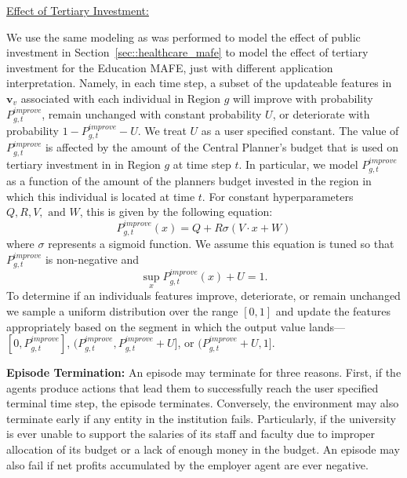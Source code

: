 \underline{Effect of Tertiary Investment:}

We use the same modeling as was performed to model the effect of public investment in Section~\ref{sec::healthcare_mafe} to model the effect of tertiary investment for the Education MAFE, just with different application interpretation. Namely, in each time step, a subset of the updateable features in $\mathbf{v}_v$ associated with each individual in Region $g$ will improve with probability $P_{g,t}^{improve}$, remain unchanged with constant probability $U$, or deteriorate with probability $1-P_{g,t}^{improve}-U$. We treat $U$ as a user specified constant. The value of $P_{g,t}^{improve}$ is affected by the amount of the Central Planner's budget that is used on tertiary investment in in Region $g$ at time step $t$. In particular, we model $P_{g,t}^{improve}$ as a function of the amount of the planners budget invested in the region in which this individual is located at time $t$. For constant hyperparameters $Q,R,V, \text{ and } W$, this is given by the following equation:
\begin{equation}
    \label{eq:improve_function}
    P_{g,t}^{improve}(x) = Q + R\sigma(V\cdot x + W)
\end{equation}
where $\sigma$ represents a sigmoid function. We assume this equation is tuned so that $P_{g,t}^{improve}$ is non-negative and 
\begin{equation}
    \sup_{x} P_{g,t}^{improve}(x) + U= 1.
\end{equation}
To determine if an individuals features improve, deteriorate, or remain unchanged we sample a uniform distribution over the range $[0,1]$ and update the features appropriately based on the segment in which the output value lands---$[0,P_{g,t}^{improve}]$, $(P_{g,t}^{improve},P_{g,t}^{improve}+U]$, or $(P_{g,t}^{improve}+U,1]$.


\textbf{Episode Termination:} An episode may terminate for three reasons. First, if the agents produce actions that lead them to successfully reach the user specified terminal time step, the episode terminates. Conversely, the environment may also terminate early if any entity in the institution fails. Particularly, if the university is ever unable to support the salaries of its staff and faculty due to improper allocation of its budget or a lack of enough money in the budget. An episode may also fail if net profits accumulated by the employer agent are ever negative.